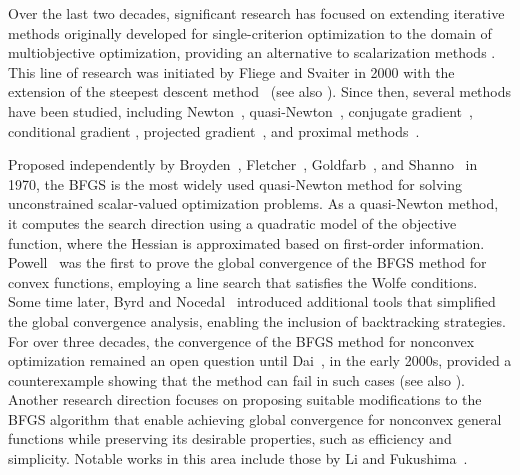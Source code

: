 \documentclass[11pt]{article}
\numberwithin{assumption}{section}
\begin{document}
Over the last two decades, significant research has focused on extending iterative methods originally developed for single-criterion  optimization to the domain of multiobjective optimization, providing an alternative to scalarization methods \cite{Eichfelder2008,miettinen1999nonlinear}. This line of research was initiated by Fliege and Svaiter in 2000 with the extension of the steepest descent method~\cite{benar&fliege} (see also \cite{mauricio&benar}). Since then, several methods have been studied, including Newton~\cite{chuong2013newton,mauriciobenarfliege,mauricionewtonvetorial,wang2019extended,gonccalves2021globally},  quasi-Newton~\cite{ansary,math8040616,superlinearly,Morovati2017,POVALEJ2014765,QU2011397,QU2014503,Leandro&Danilo,Lapucci2023},  conjugate gradient~\cite{Goncalves2019,cgvo,GONCALVES2022127099}, conditional gradient \cite{Assuncao2021,Chen2023}, projected gradient~\cite{luis-jef-yun,fazzio2019convergence,fukuda2011convergence,fukuda2013inexact,mauricio&iusem}, and proximal  methods~\cite{bonnel2005proximal,ceng2010hybrid,ceng2007approximate,chuong2011generalized,chuong2011hybrid}.

Proposed independently by Broyden~\cite{Broyden70}, Fletcher~\cite{Fletcher70}, Goldfarb~\cite{Goldfarb70}, and Shanno~\cite{Shanno70} in 1970, the BFGS is the most widely used quasi-Newton method for solving unconstrained scalar-valued optimization problems. As a quasi-Newton method, it computes the search direction using a quadratic model of the objective function, where the Hessian is approximated based on first-order information. Powell~\cite{powell1976some} was the first to prove the global convergence of the BFGS method for convex functions, employing a line search that satisfies the Wolfe conditions. Some time later, Byrd and Nocedal~\cite{Tool} introduced additional tools that simplified the global convergence analysis, enabling the inclusion of backtracking strategies. For over three decades, the convergence of the BFGS method for nonconvex optimization remained an open question until Dai~\cite{dai2002convergence}, in the early 2000s, provided a counterexample showing that the method can fail in such cases (see also \cite{dai2013perfect,mascarenhas2004bfgs}).
Another research direction focuses on proposing suitable modifications to the BFGS algorithm that enable achieving global convergence for nonconvex general functions while preserving its desirable properties, such as efficiency and simplicity. Notable works in this area include those by Li and Fukushima~\cite{Li-Fu-MBFGS,Li-Fu-SIAM}.
\end{document}
